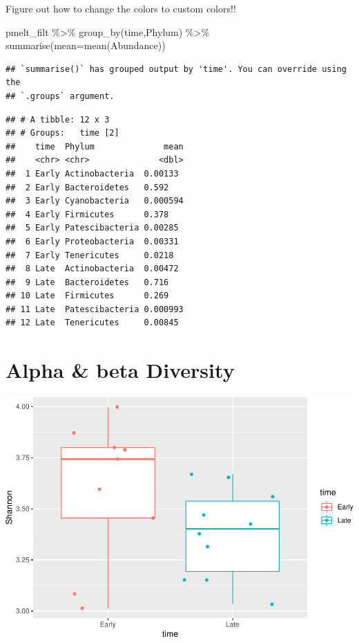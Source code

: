 \documentclass[
]{book}
\newenvironment{Shaded}{\begin{snugshade}}{\end{snugshade}}
\newcommand{\AttributeTok}[1]{\textcolor[rgb]{0.77,0.63,0.00}{#1}}
\newcommand{\FunctionTok}[1]{\textcolor[rgb]{0.00,0.00,0.00}{#1}}
\newcommand{\NormalTok}[1]{#1}
\newcommand{\SpecialCharTok}[1]{\textcolor[rgb]{0.00,0.00,0.00}{#1}}
\begin{document}
Figure out how to change the colors to custom colors!!

\begin{Shaded}
\begin{Highlighting}[]
\NormalTok{pmelt\_filt }\SpecialCharTok{\%\textgreater{}\%} \FunctionTok{group\_by}\NormalTok{(time,Phylum) }\SpecialCharTok{\%\textgreater{}\%} \FunctionTok{summarise}\NormalTok{(}\AttributeTok{mean=}\FunctionTok{mean}\NormalTok{(Abundance))}
\end{Highlighting}
\end{Shaded}

\begin{verbatim}
## `summarise()` has grouped output by 'time'. You can override using the
## `.groups` argument.
\end{verbatim}

\begin{verbatim}
## # A tibble: 12 x 3
## # Groups:   time [2]
##    time  Phylum              mean
##    <chr> <chr>              <dbl>
##  1 Early Actinobacteria  0.00133 
##  2 Early Bacteroidetes   0.592   
##  3 Early Cyanobacteria   0.000594
##  4 Early Firmicutes      0.378   
##  5 Early Patescibacteria 0.00285 
##  6 Early Proteobacteria  0.00331 
##  7 Early Tenericutes     0.0218  
##  8 Late  Actinobacteria  0.00472 
##  9 Late  Bacteroidetes   0.716   
## 10 Late  Firmicutes      0.269   
## 11 Late  Patescibacteria 0.000993
## 12 Late  Tenericutes     0.00845
\end{verbatim}

\hypertarget{alpha-beta-diversity}{%
\section{Alpha \& beta Diversity}\label{alpha-beta-diversity}}

\includegraphics{16sworkshop_files/figure-latex/alpha diversit-1.pdf}
\end{document}
